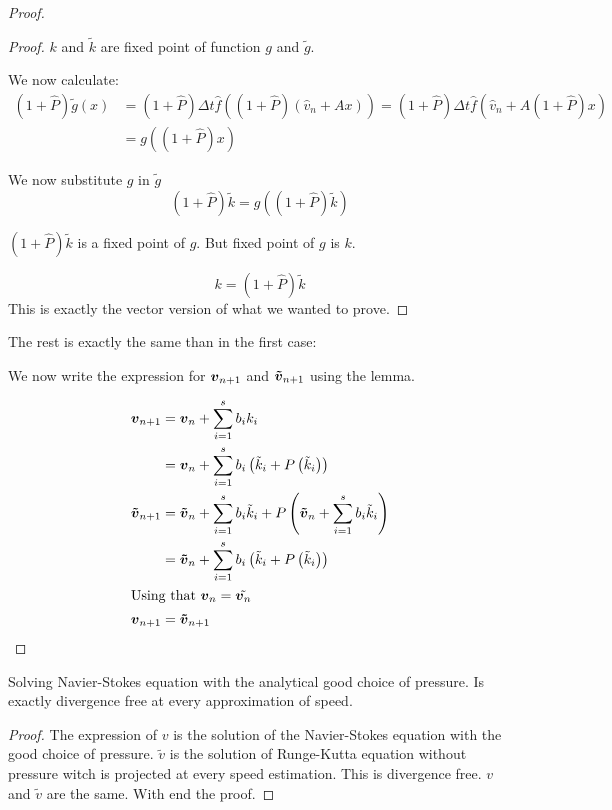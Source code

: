 \begin{proof}
\begin{proof}
$k$ and $\tilde{k}$ are fixed point of function $g$ and $\tilde{g}$.

We now calculate:
\begin{align}
 (1+\hat{P})\tilde{g}(x)&=(1+\hat{P})\Delta t \hat{f}((1+\hat{P})(\hat{v}_{n}+Ax))=(1+\hat{P})\Delta t \hat{f}(\hat{v}_{n}+A (1+\hat{P})x)\\
 &=g((1+\hat{P})x)
\end{align}

We now substitute $g$ in $\tilde{g}$
\begin{equation}
(1+\hat{P})\tilde{k}=g((1+\hat{P})\tilde{k})
\end{equation}

$(1+\hat{P})\tilde{k}$ is a fixed point of $g$.
But fixed point of $g$ is $k$.

\begin{equation}
 k=(1+\hat{P})\tilde{k}
\end{equation}
This is exactly the vector version of what we wanted to prove.
 \end{proof}
 
 The rest is exactly the same than in the first case:
 
 We now write the expression for ${\boldsymbol {v}}_{n+1}$ and ${\boldsymbol {\tilde{v}}}_{n+1}$ using the lemma.
 
 \begin{align*}
 {\boldsymbol {v}}_{n+1}&={\boldsymbol {v}}_{n}+\sum_{i=1}^{s}b_{i}k_{i}\\
 &={\boldsymbol {v}}_{n}+\sum_{i=1}^{s}b_{i}\left(\tilde{k}_{i}+P\left(\tilde{k}_{i}\right)\right)\\
 {\boldsymbol {\tilde{v}}}_{n+1}&={\boldsymbol {\tilde{v}}}_{n}+\sum_{i=1}^{s}b_{i}\tilde{k}_{i}+P\left({\boldsymbol {\tilde{v}}}_{n}+\sum_{i=1}^{s}b_{i}\tilde{k}_{i}\right)\\
 &={\boldsymbol {\tilde{v}}}_{n}+\sum_{i=1}^{s}b_{i}\left(\tilde{k}_{i}+P\left(\tilde{k}_{i}\right)\right)\\
 \intertext{Using that ${\boldsymbol {v}}_{n}=\tilde{{\boldsymbol {v}}_{n}}$}
 {\boldsymbol {v}}_{n+1}&={\boldsymbol {\tilde{v}}}_{n+1}
 \end{align*}

 \end{proof}
 
 \begin{cor}
Solving Navier-Stokes equation with the analytical good choice of pressure.
Is exactly divergence free at every approximation of speed.
 \end{cor}
 \begin{proof}
  The expression of $v$ is the solution of the Navier-Stokes equation with the good choice of pressure.
  $\tilde{v}$ is the solution of Runge-Kutta equation without pressure witch is projected at every speed estimation.
  This is divergence free.
  $v$ and $\tilde{v}$ are the same. With end the proof.
 \end{proof}
 
